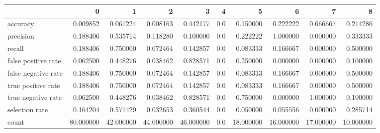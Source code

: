 \begin{tabular}{lrrrrrrrrr}
\toprule
{} &          0 &          1 &          2 &          3 &    4 &          5 &          6 &          7 &          8 \\
\midrule
accuracy            &   0.009852 &   0.061224 &   0.008163 &   0.442177 &  0.0 &   0.150000 &   0.222222 &   0.666667 &   0.214286 \\
precision           &   0.188406 &   0.535714 &   0.118280 &   0.100000 &  0.0 &   0.222222 &   1.000000 &   0.000000 &   0.333333 \\
recall              &   0.188406 &   0.750000 &   0.072464 &   0.142857 &  0.0 &   0.083333 &   0.166667 &   0.000000 &   0.500000 \\
false positive rate &   0.062500 &   0.448276 &   0.038462 &   0.828571 &  0.0 &   0.250000 &   0.000000 &   0.000000 &   0.100000 \\
false negative rate &   0.188406 &   0.750000 &   0.072464 &   0.142857 &  0.0 &   0.083333 &   0.166667 &   0.000000 &   0.500000 \\
true positive rate  &   0.188406 &   0.750000 &   0.072464 &   0.142857 &  0.0 &   0.083333 &   0.166667 &   0.000000 &   0.500000 \\
true negative rate  &   0.062500 &   0.448276 &   0.038462 &   0.828571 &  0.0 &   0.750000 &   0.000000 &   1.000000 &   0.100000 \\
selection rate      &   0.164204 &   0.571429 &   0.032653 &   0.360544 &  0.0 &   0.050000 &   0.055556 &   0.000000 &   0.285714 \\
count               &  80.000000 &  42.000000 &  44.000000 &  46.000000 &  0.0 &  18.000000 &  16.000000 &  17.000000 &  10.000000 \\
\bottomrule
\end{tabular}
